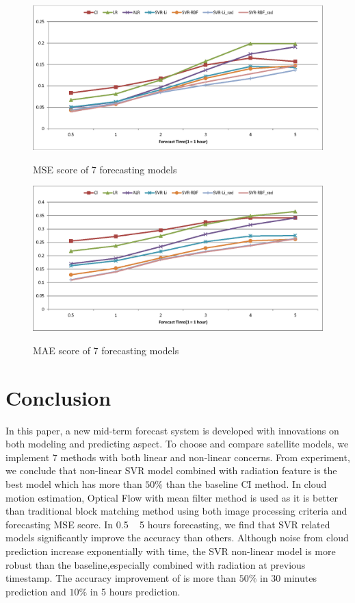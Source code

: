 \documentclass[conference]{IEEEtran}
\begin{document}
\begin{figure}[h]
\centering
\includegraphics[width=3 in]{modelsmse_pre}
\label{fig:modelsmse_pre}
\caption{MSE score of 7 forecasting models}
\end{figure}

\begin{figure}[h]
\centering
\includegraphics[width=3 in]{modelsmae_pre}
\label{fig:modelsmae_pre}
\caption{MAE score of 7 forecasting models}
\end{figure}


\section{Conclusion} %
\label{sec:conclusion}


In this paper, a new mid-term forecast system is developed with innovations on
both modeling and predicting aspect. To choose and compare satellite
models, we implement 7 methods with both linear and non-linear concerns. From
experiment, we conclude that non-linear SVR model combined with radiation feature is the
best model which has more than $50\%$ than the baseline CI method. In
cloud motion estimation, Optical Flow with mean filter method is used as it is
better than traditional block matching method using both image processing
criteria and forecasting MSE score. In 0.5 ~ 5 hours forecasting, we find
that SVR related models significantly improve the accuracy than others. Although
noise from cloud prediction increase exponentially with time, the SVR non-linear
model is more robust than the baseline,especially combined with radiation at
previous timestamp. The accuracy improvement of is more than $50\%$ in 30
minutes prediction and  $10\%$ in 5 hours prediction.
\end{document}
